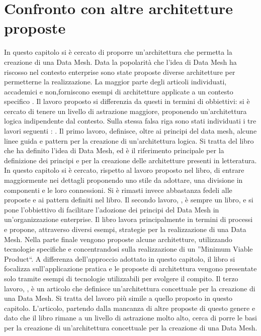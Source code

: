 \documentclass[12pt]{report}
\begin{document}
\section{Confronto con altre architetture proposte}
In questo capitolo si è cercato di proporre un'architettura che permetta la creazione di una Data Mesh. 
Data la popolarità che l'idea di Data Mesh ha riscosso nel contesto enterprise sono state proposte diverse architetture per permetterne la realizzazione.
La maggior parte degli articoli individuati, accademici e non,forniscono esempi di architetture applicate a un contesto specifico \cite{falconi2023adopting,pakrashi2023cowmesh,joshi_data_2021,blog_data_2022}.
Il lavoro proposto si differenzia da questi in termini di obbiettivi: si è cercato di tenere un livello di astrazione maggiore, proponendo un'architettura logica indipendente dal contesto. 
Sulla stessa falsa riga sono stati individuati i tre lavori seguenti : \cite{dehghani_data_2022, majchrzak2023data,machado2021data}.
Il primo lavoro, \cite{dehghani_data_2022} definisce, oltre ai principi del data mesh, alcune linee guida e pattern per la creazione di un'architettura logica.
Si tratta del libro che ha definito l'idea di Data Mesh, ed è il riferimento principale per la definizione dei principi e per la creazione delle architetture presenti in letteratura.
In questo capitolo si è cercato, rispetto al lavoro proposto nel libro, di entrare maggiormente nei dettagli proponendo uno stile da adottare, una divisione in componenti e le loro connessioni.
Si è rimasti invece abbastanza fedeli alle proposte e ai pattern definiti nel libro.
Il secondo lavoro, \cite{majchrzak2023data}, è sempre un libro, e si pone l'obbiettivo di facilitare l'adozione dei principi del Data Mesh in un'organizzazione enterprise.
Il libro lavora principalmente in termini di processi e propone, attraverso diversi esempi, strategie per la realizzazione di una Data Mesh.
Nella parte finale vengono proposte alcune architetture, utilizzando tecnologie specifiche e concentrandosi sulla realizzazione di un ''Minimum Viable Product``.
A differenza dell'approccio adottato in questo capitolo, il libro si focalizza sull'applicazione pratica e le proposte di architettura vengono presentate solo tramite esempi di tecnologie utilizzabili per svolgere il compito.
Il terzo lavoro, \cite{machado2021data}, è un articolo che definisce un'architettura concettuale per la creazione di una Data Mesh.
Si tratta del lavoro più simile a quello proposto in questo capitolo.
L'articolo, partendo dalla mancanza di altre proposte di questo genere e dato che il libro \cite{dehghani_data_2022} rimane a un livello di astrazione molto alto, cerca di porre le basi per la creazione di un'architettura concettuale per la creazione di una Data Mesh.
\end{document}

